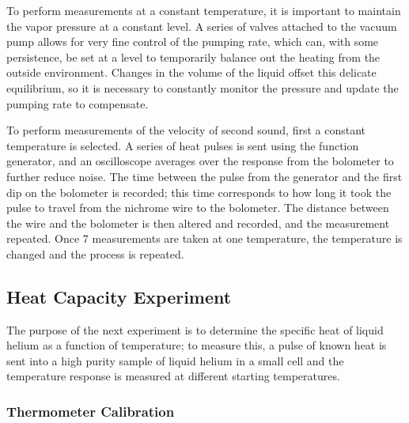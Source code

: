 To perform measurements at a constant temperature, it is important to maintain the vapor pressure at a constant level. A series of valves attached to the vacuum pump allows for very fine control of the pumping rate, which can, with some persistence, be set at a level to temporarily balance out the heating from the outside environment. Changes in the volume of the liquid offset this delicate equilibrium, so it is necessary to constantly monitor the pressure and update the pumping rate to compensate.

To perform measurements of the velocity of second sound, first a constant temperature is selected. A series of heat pulses is sent using the function generator, and an oscilloscope averages over the response from the bolometer to further reduce noise. The time between the pulse from the generator and the first dip on the bolometer is recorded; this time corresponds to how long it took the pulse to travel from the nichrome wire to the bolometer. The distance between the wire and the bolometer is then altered and recorded, and the measurement repeated. Once 7 measurements are taken at one temperature, the temperature is changed and the process is repeated.

\subsection{Heat Capacity Experiment}\label{heatcapacityexperiment}

The purpose of the next experiment is to determine the specific heat of liquid helium as a function of temperature; to measure this, a pulse of known heat is sent into a high purity sample of liquid helium in a small cell and the temperature response is measured at different starting temperatures.

\subsubsection{Thermometer Calibration}

